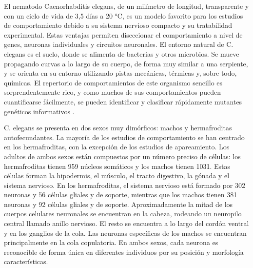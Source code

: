 

El nematodo Caenorhabditis elegans, de un milímetro de longitud, transparente y con un ciclo de vida de 3,5 días a 20 °C, es un modelo favorito para los estudios de comportamiento debido a su sistema nervioso compacto y su tratabilidad experimental. Estas ventajas permiten diseccionar el comportamiento a nivel de genes, neuronas individuales y circuitos neuronales. El entorno natural de C. elegans es el suelo, donde se alimenta de bacterias y otros microbios. Se mueve propagando curvas a lo largo de su cuerpo, de forma muy similar a una serpiente, y se orienta en su entorno utilizando pistas mecánicas, térmicas y, sobre todo, químicas. El repertorio de comportamientos de este organismo sencillo es sorprendentemente rico, y como muchos de sus comportamientos pueden cuantificarse fácilmente, se pueden identificar y clasificar rápidamente mutantes genéticos informativos \cite{bono_neuronal_2005}. 









C. elegans se presenta en dos sexos muy dimórficos: machos y hermafroditas autofecundantes. La mayoría de los estudios de comportamiento se han centrado en los hermafroditas, con la excepción de los estudios de apareamiento. Los adultos de ambos sexos están compuestos por un número preciso de células: los hermafroditas tienen 959 núcleos somáticos y los machos tienen 1031. Estas células forman la hipodermis, el músculo, el tracto digestivo, la gónada y el sistema nervioso. En los hermafroditas, el sistema nervioso está formado por 302 neuronas y 56 células gliales y de soporte, mientras que los machos tienen 381 neuronas y 92 células gliales y de soporte. Aproximadamente la mitad de los cuerpos celulares neuronales se encuentran en la cabeza, rodeando un neuropilo central llamado anillo nervioso. El resto se encuentra a lo largo del cordón ventral y en los ganglios de la cola. Las neuronas específicas de los machos se encuentran principalmente en la cola copulatoria. En ambos sexos, cada neurona es reconocible de forma única en diferentes individuos por su posición y morfología características.